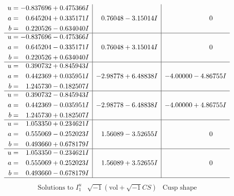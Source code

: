 \documentclass[1p]{elsarticle_modified}
\theoremstyle{definition}
\newcommand{\I}{\sqrt{-1}}
\begin{document}
$$\begin{array}{c|c|c}
\begin{aligned}
u &= -0.837696 + 0.475366 I \\
a &= \phantom{-}0.645204 + 0.335171 I \\
b &= \phantom{-}0.220526 - 0.634040 I\end{aligned}
 & \phantom{-}0.76048 - 3.15014 I & \phantom{-0.000000 } 0 \\ \hline\begin{aligned}
u &= -0.837696 - 0.475366 I \\
a &= \phantom{-}0.645204 - 0.335171 I \\
b &= \phantom{-}0.220526 + 0.634040 I\end{aligned}
 & \phantom{-}0.76048 + 3.15014 I & \phantom{-0.000000 } 0 \\ \hline\begin{aligned}
u &= \phantom{-}0.390732 + 0.845943 I \\
a &= \phantom{-}0.442369 + 0.035951 I \\
b &= \phantom{-}1.245730 - 0.182507 I\end{aligned}
 & -2.98778 + 6.48838 I & -4.00000 - 4.86755 I \\ \hline\begin{aligned}
u &= \phantom{-}0.390732 - 0.845943 I \\
a &= \phantom{-}0.442369 - 0.035951 I \\
b &= \phantom{-}1.245730 + 0.182507 I\end{aligned}
 & -2.98778 - 6.48838 I & -4.00000 + 4.86755 I \\ \hline\begin{aligned}
u &= \phantom{-}1.053350 + 0.234621 I \\
a &= \phantom{-}0.555069 - 0.252023 I \\
b &= \phantom{-}0.493660 + 0.678179 I\end{aligned}
 & \phantom{-}1.56089 - 3.52655 I & \phantom{-0.000000 } 0 \\ \hline\begin{aligned}
u &= \phantom{-}1.053350 - 0.234621 I \\
a &= \phantom{-}0.555069 + 0.252023 I \\
b &= \phantom{-}0.493660 - 0.678179 I\end{aligned}
 & \phantom{-}1.56089 + 3.52655 I & \phantom{-0.000000 } 0\\
 \hline 
 \end{array}$$\newpage$$\begin{array}{c|c|c}  
\text{Solutions to }I^u_{1}& \I (\text{vol} + \sqrt{-1}CS) & \text{Cusp shape}\\

\end{array}$$
\end{document}
